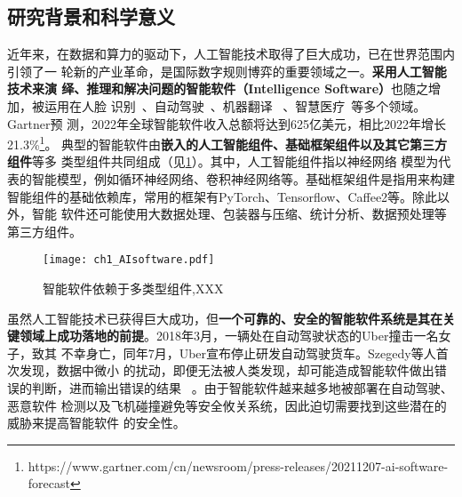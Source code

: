 
\subsection{研究背景和科学意义}



%
近年来，在数据和算力的驱动下，人工智能技术取得了巨大成功，已在世界范围内引领了一
轮新的产业革命，是国际数字规则博弈的重要领域之一。\textbf{{采用人工智能技术来演
绎、推理和解决问题的智能软件（Intelligence Software）}}也随之增加，被运用在人脸
识别~\cite{meng2021magface}、自动驾驶~\cite{zhang2018deeproad}、机器翻译
~\cite{johnson2017google}、智慧医疗~\cite{zhang2021tau}等多个领域。Gartner预
测，2022年全球智能软件收入总额将达到625亿美元，相比2022年增长
21.3\%\footnote{https://www.gartner.com/cn/newsroom/press-releases/20211207-ai-software-forecast}。
典型的智能软件由\textbf{嵌入的人工智能组件、基础框架组件以及其它第三方组件}等多
类型组件共同组成（见\cref{fig:ch1:aisoftware}）。其中，人工智能组件指以神经网络
模型为代表的智能模型，例如循环神经网络、卷积神经网络等。基础框架组件是指用来构建
智能组件的基础依赖库，常用的框架有PyTorch、Tensorflow、Caffee2等。除此以外，智能
软件还可能使用大数据处理、包装器与压缩、统计分析、数据预处理等第三方组件。

\begin{figure}[htp]
    \centering
    \texttt{[image: ch1\_AIsoftware.pdf]}
    \caption{智能软件依赖于多类型组件,XXX}
    \label{fig:ch1:aisoftware}
\end{figure}


虽然人工智能技术已获得巨大成功，但\textbf{一个可靠的、安全的智能软件系统是其在关
键领域上成功落地的前提}。2018年3月，一辆处在自动驾驶状态的Uber撞击一名女子，致其
不幸身亡，同年7月，Uber宣布停止研发自动驾驶货车。Szegedy等人首次发现，数据中微小
的扰动，即便无法被人类发现，却可能造成智能软件做出错误的判断，进而输出错误的结果
~\cite{szegedy2013intriguing}。由于智能软件越来越多地被部署在自动驾驶、恶意软件
检测以及飞机碰撞避免等安全攸关系统，因此迫切需要找到这些潜在的威胁来提高智能软件
的安全性。

